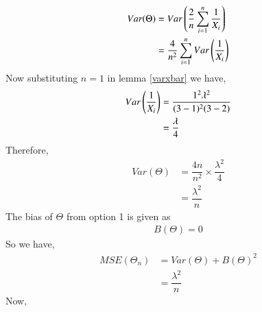 \documentclass[journal,12pt,twocolumn]{IEEEtran}
\theoremstyle{definition}
\begin{document}
\begin{enumerate}
\begin{align}
    Var(\Theta) &= Var\left(\dfrac{2}{n} \sum_{i=1}^{n} \dfrac{1}{X_i} \right) \\
    & = \dfrac{4}{n^2} \sum_{i=1}^{n} Var\left(\dfrac{1}{X_i}\right) 
    \label{eq3}
\end{align}
Now substituting $ n=1 $ in lemma \ref{varxbar} we have,
\begin{align}
     Var\left(\dfrac{1}{X_i}\right) &= \dfrac{1^2\lambda^2}{(3-1)^2(3-2)}\\
     &= \dfrac{\lambda}{4}
\end{align}
Therefore,
\begin{align}
 Var(\Theta)   & = \dfrac{4n}{n^2} \times \dfrac{\lambda^2}{4} \\
    &= \dfrac{\lambda^2}{n}
\end{align}
The bias of $ \Theta $ from option 1 is given as
\begin{align}
    B(\Theta) = 0
\end{align}
So we have,
\begin{align}
    MSE(\Theta_n) &= Var(\Theta) + B(\Theta)^2 \\
    &= \dfrac{\lambda^2}{n}
\end{align}
Now,


\end{enumerate}
\end{document}
